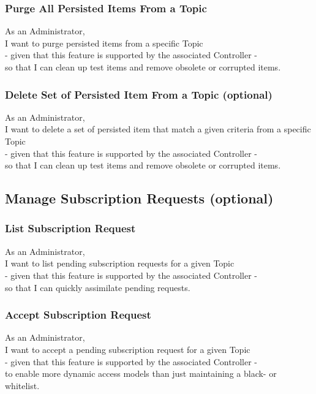 \subsubsection{Purge All Persisted Items From a Topic}

As an Administrator,\\
I want to purge persisted items from a specific Topic\\
- given that this feature is supported by the associated Controller -\\
so that I can clean up test items and remove obsolete or corrupted items.

\subsubsection{Delete Set of Persisted Item From a Topic (optional)}

As an Administrator,\\
I want to delete a set of persisted item that match a given criteria from a specific Topic\\
- given that this feature is supported by the associated Controller -\\
so that I can clean up test items and remove obsolete or corrupted items.

\subsection{Manage Subscription Requests (optional)}

\subsubsection{List Subscription Request}
As an Administrator,\\
I want to list pending subscription requests for a given Topic\\
- given that this feature is supported by the associated Controller -\\
so that I can quickly assimilate pending requests.

\subsubsection{Accept Subscription Request}

As an Administrator,\\
I want to accept a pending subscription request for a given Topic\\
- given that this feature is supported by the associated Controller -\\
to enable more dynamic access models than just maintaining a black- or whitelist.

